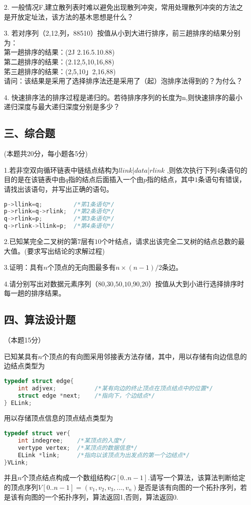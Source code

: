 2. 一般情况F,建立散列表时难以避免出现散列冲突，常用处理散列冲突的方法之 是开放定址法，该方法的基木思想是什么？

3. 若对序列（2,12,列，88510）按值从小到大进行排序，前三趟排序的结果分别为： \\
第一趟排序的结果：(2J 2.16.5.10.88) \\
第二趟排序的结果：(2.12,5,10,16,88) \\
笫三趟排序的结果：(2,5,10」2,16,88) \\
请问：该结果是采用了选择排序法还是采用了（起）泡排序法得到的？为付么？

4. 快速排序法的排序过程是递归的。若待排序序列的长度为n,则快速排序的最小 递归深度与最大递归深度分别是多少？

\subsection{三、综合题}
(本题共20分，每小题各5分)

1.若非空双向循环链表中链结点结构为$llink$|$data$|$rlink$ ,则依次执行下列$4$条语句的目的是在该链表中由$q$指的结点后面插入一个由$p$指的结点，其中$1$条语句有错误，请找出该语句，并写出正确的语句。
\begin{lstlisting}[language=cpp]
p->llink=q;         /*笫1条语句*/
p->rlink=q->rlink;  /*第2条语句*/
q->rlink=p;         /*第3条语句*/
q->rlink->llink=p;  /*第4条语句*/
\end{lstlisting}

2.已知某完全二叉树的第$7$层有$10$个叶结点，请求出该完全二叉树的结点总数的最大值。(要求写出结论的求解过程)

3.证明：具有$n$个顶点的无向图最多有$n\times(n-1)/2$条边。

4.请分别写出对数据元素序列（$80$,$30$,$50$,$10$,$90$,$20$）按值从大到小进行选择排序时每一趟的排序结果。

\subsection{四、算法设计题}
（本题15分）

已知某具有$n$个顶点的有向图采用邻接表方法存储，其中，用以存储有向边信息的边结点类型为
\begin{lstlisting}[language=cpp]
typedef struct edge{
    int adjvex;           /*某有向边的终止顶点在顶点结点中的位置*/
    struct edge *next;    /*指向下，个边结点*/
} ELink;
\end{lstlisting}
用以存储顶点信息的顶点结点类型为
\begin{lstlisting}[language=cpp]
typedef struct ver{
    int indegree;    /*某顶点的入度*/
    vertype vertex;  /*某顶点的数据信息*/
    ELink *link;     /*指向以该顶点为出发点的第一个边结点*/
}VLink;
\end{lstlisting}
并且$n$个顶点结点构成一个数组结构$G[0..n-1]$.请写一个算法，该算法判断给定的顶点序列$V[0..n-1]=(v_1,v_2,v_3,...,v_n)$是否是该有向图的一个拓扑序列，若是该有向图的一个拓扑序列，算法返回1,否则，算法返回0.

